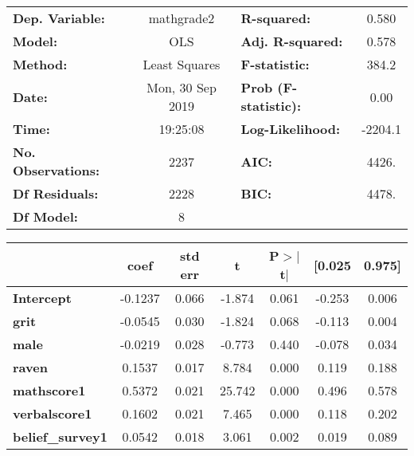 \documentclass{report}
\begin{document}
\begin{center}
\begin{tabular}{lclc}
\toprule
\textbf{Dep. Variable:}    &    mathgrade2    & \textbf{  R-squared:         } &     0.580   \\
\textbf{Model:}            &       OLS        & \textbf{  Adj. R-squared:    } &     0.578   \\
\textbf{Method:}           &  Least Squares   & \textbf{  F-statistic:       } &     384.2   \\
\textbf{Date:}             & Mon, 30 Sep 2019 & \textbf{  Prob (F-statistic):} &     0.00    \\
\textbf{Time:}             &     19:25:08     & \textbf{  Log-Likelihood:    } &   -2204.1   \\
\textbf{No. Observations:} &        2237      & \textbf{  AIC:               } &     4426.   \\
\textbf{Df Residuals:}     &        2228      & \textbf{  BIC:               } &     4478.   \\
\textbf{Df Model:}         &           8      & \textbf{                     } &             \\
\bottomrule
\end{tabular}
\begin{tabular}{lcccccc}
                         & \textbf{coef} & \textbf{std err} & \textbf{t} & \textbf{P$> |$t$|$} & \textbf{[0.025} & \textbf{0.975]}  \\
\midrule
\textbf{Intercept}       &      -0.1237  &        0.066     &    -1.874  &         0.061        &       -0.253    &        0.006     \\
\textbf{grit}            &      -0.0545  &        0.030     &    -1.824  &         0.068        &       -0.113    &        0.004     \\
\textbf{male}            &      -0.0219  &        0.028     &    -0.773  &         0.440        &       -0.078    &        0.034     \\
\textbf{raven}           &       0.1537  &        0.017     &     8.784  &         0.000        &        0.119    &        0.188     \\
\textbf{mathscore1}      &       0.5372  &        0.021     &    25.742  &         0.000        &        0.496    &        0.578     \\
\textbf{verbalscore1}    &       0.1602  &        0.021     &     7.465  &         0.000        &        0.118    &        0.202     \\
\textbf{belief\_survey1} &       0.0542  &        0.018     &     3.061  &         0.002        &        0.019    &        0.089     \\

\end{tabular}
\end{center}
\end{document}
